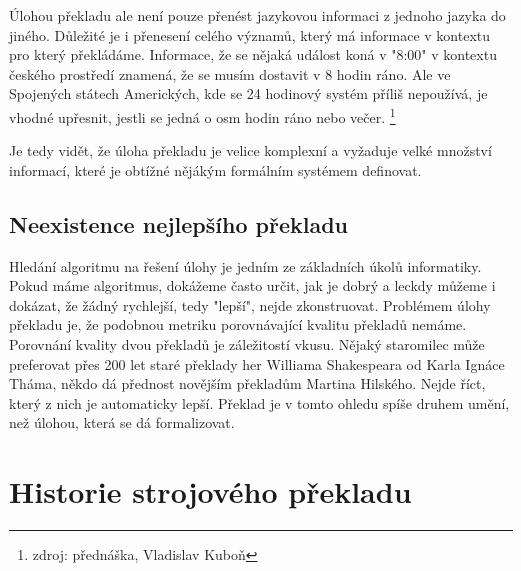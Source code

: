 \documentclass[12pt,a4paper]{report}
\begin{document}
Úlohou překladu ale není pouze přenést jazykovou informaci z jednoho jazyka do jiného. Důležité je i přenesení celého významů, který má informace v kontextu pro který překládáme. Informace, že se nějaká událost koná v "8:00" v kontextu českého prostředí znamená, že se musím dostavit v 8 hodin ráno. Ale ve Spojených státech Amerických, kde se 24 hodinový systém příliš nepoužívá, je vhodné upřesnit, jestli se jedná o osm hodin ráno nebo večer. \footnote{zdroj: přednáška, Vladislav Kuboň}

Je tedy vidět, že úloha překladu je velice komplexní a vyžaduje velké množství informací, které je obtížné nějákým formálním systémem definovat.


\subsection{Neexistence nejlepšího překladu}
Hledání algoritmu na řešení úlohy je jedním ze základních úkolů informatiky. Pokud máme algoritmus, dokážeme často určit, jak je dobrý a leckdy můžeme i dokázat, že žádný rychlejší, tedy "lepší", nejde zkonstruovat. Problémem úlohy překladu je, že podobnou metriku porovnávající kvalitu překladů nemáme. Porovnání kvality dvou překladů je záležitostí vkusu. Nějaký staromilec může preferovat přes 200 let staré překlady her Williama Shakespeara od Karla Ignáce Tháma, někdo dá přednost novějším překladům Martina Hilského. Nejde říct, který z nich je automaticky lepší. Překlad je v tomto ohledu spíše druhem umění, než úlohou, která se dá formalizovat.



\section{Historie strojového překladu}
\end{document}
